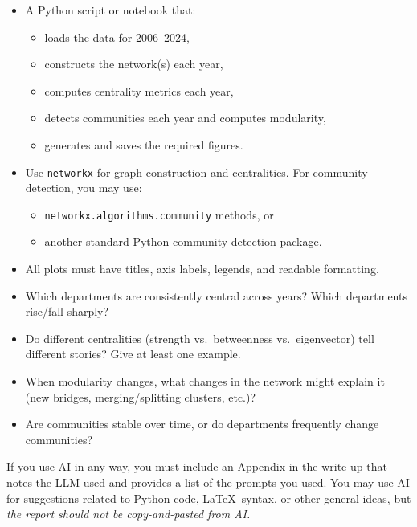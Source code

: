 \documentclass[article, 11pt]{article}
\begin{document}
\begin{itemize}
\item A Python script or notebook that:
  \begin{itemize}
  \item loads the data for 2006--2024,
  \item constructs the network(s) each year,
  \item computes centrality metrics each year,
  \item detects communities each year and computes modularity,
  \item generates and saves the required figures.
  \end{itemize}
\item Use \texttt{networkx} for graph construction and centralities. For community detection, you may use:
  \begin{itemize}
    \item \texttt{networkx.algorithms.community} methods, or
    \item another standard Python community detection package.
  \end{itemize}
\item All plots must have titles, axis labels, legends, and readable formatting.
\end{itemize}

\vspace{.35cm}

\noindent {}

\vspace{-.35cm}
\noindent \hrulefill

\begin{itemize}
\item Which departments are consistently central across years? Which departments rise/fall sharply?
\item Do different centralities (strength vs.\ betweenness vs.\ eigenvector) tell different stories? Give at least one example.
\item When modularity changes, what changes in the network might explain it (new bridges, merging/splitting clusters, etc.)?
\item Are communities stable over time, or do departments frequently change communities?
\end{itemize}

\vspace{.35cm}

\noindent {}

\vspace{-.35cm}
\noindent \hrulefill

If you use AI in any way, you must include an Appendix in the write-up that notes the LLM used and provides a list of the prompts you used. You may use AI for suggestions related to Python code, \LaTeX\, syntax, or other general ideas, but \textit{the report should not be copy-and-pasted from AI.}

\pagebreak
\end{document}
